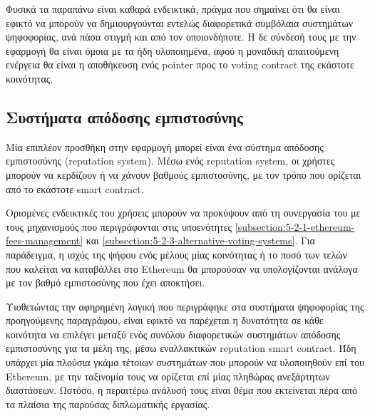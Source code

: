 Φυσικά τα παραπάνω είναι καθαρά ενδεικτικά, πράγμα που σημαίνει ότι θα είναι εφικτό να μπορούν να δημιουργούνται εντελώς διαφορετικά συμβόλαια συστημάτων ψηφοφορίας, ανά πάσα στιγμή και από τον οποιονδήποτε. Η δε σύνδεσή τους με την εφαρμογή θα είναι όμοια με τα ήδη υλοποιημένα, αφού η μοναδική απαιτούμενη ενέργεια θα είναι η αποθήκευση ενός pointer προς το voting contract της εκάστοτε κοινότητας.

\subsection{Συστήματα απόδοσης εμπιστοσύνης}\label{subsection:5-2-4-reputation-systems}

Μία επιπλέον προσθήκη στην εφαρμογή μπορεί είναι ένα σύστημα απόδοσης εμπιστοσύνης (reputation system). Μέσω ενός reputation system, οι χρήστες μπορούν να κερδίζουν ή να χάνουν βαθμούς εμπιστοσύνης, με τον τρόπο που ορίζεται από το εκάστοτε smart contract.

Ορισμένες ενδεικτικές του χρήσεις μπορούν να προκύψουν από τη συνεργασία του με τους μηχανισμούς που περιγράφονται στις υποενότητες \ref{subsection:5-2-1-ethereum-fees-management} και \ref{subsection:5-2-3-alternative-voting-systems}. Για παράδειγμα, η ισχύς της ψήφου ενός μέλους μίας κοινότητας ή το ποσό των τελών που καλείται να καταβάλλει στο Ethereum θα μπορούσαν να υπολογίζονται ανάλογα με τον βαθμό εμπιστοσύνης που έχει αποκτήσει.

Υιοθετώντας την αφηρημένη λογική που περιγράφηκε στα συστήματα ψηφοφορίας της προηγούμενης παραγράφου, είναι εφικτό να παρέχεται η δυνατότητα σε κάθε κοινότητα να επιλέγει μεταξύ ενός συνόλου διαφορετικών συστημάτων απόδοσης εμπιστοσύνης για τα μέλη της, μέσω εναλλακτικών reputation smart contract. Ήδη υπάρχει μία πλούσια γκάμα τέτοιων συστημάτων που μπορούν να υλοποιηθούν επί του Ethereum, με την ταξινομία τους να ορίζεται επί μίας πληθώρας ανεξάρτητων διαστάσεων\cite{5.2-taxonomy-of-reputation-systems}. Ωστόσο, η περαιτέρω ανάλυσή τους είναι θέμα που εκτείνεται πέρα από τα πλαίσια της παρούσας διπλωματικής εργασίας.
